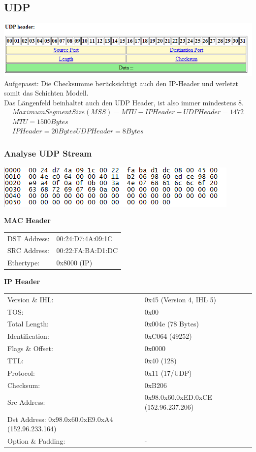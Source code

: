 \subsection{UDP}

\includegraphics[scale=0.8]{media/UDPHeader.png}
Aufgepasst: Die Checksumme berücksichtigt auch den IP-Header und verletzt somit das Schichten Modell. \\
Das Längenfeld beinhaltet auch den UDP Header, ist also immer mindestens 8.
\\
\begin{align*}
Maximum Segment Size (MSS) = MTU - IPHeader - UDP Header = 1472\\
MTU = 1500Bytes\\
IPHeader = 20 Bytes
UDPHeader = 8Bytes
\end{align*}

\subsubsection{Analyse UDP Stream}

\includegraphics[scale=1.0]{media/UDPStream.png}

\textbf{MAC Header}\\
\begin{tabular}[h]{ll}
DST Address: & 00:24:D7:4A:09:1C\\
SRC Address: & 00:22:FA:BA:D1:DC\\
Ethertype: & 0x8000 (IP)\\
\end{tabular}


\textbf{IP Header}\\
\begin{tabular}[h]{ll}
Version \& IHL: & 0x45 (Version 4, IHL 5)\\
TOS: & 0x00\\
Total Length: & 0x004e (78 Bytes)\\
Identification: & 0xC064 (49252)\\
Flags \& Offset: & 0x0000\\
TTL: & 0x40 (128)\\
Protocol: & 0x11 (17/UDP)\\
Checksum: & 0xB206 \\
Src Address: & 0x98.0x60.0xED.0xCE (152.96.237.206)\\
Dst Address: 0x98.0x60.0xE9.0xA4 (152.96.233.164)\\
Option \& Padding: & -\\
\end{tabular}

